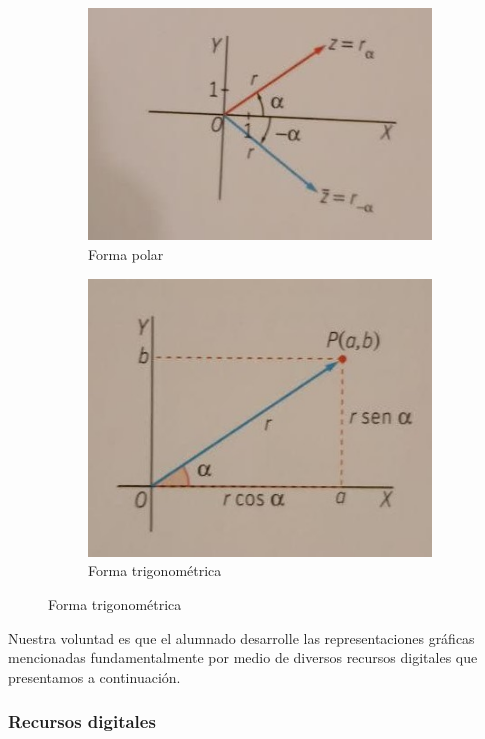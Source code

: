 \documentclass[../main.tex]{memoir}
\begin{document}
\begin{figure}[H]
	\centering
	\begin{subfigure}{0.48\textwidth}
		\centering
		\includegraphics[width=\linewidth]{images/polar.jpg}
		\caption{Forma polar}
	\end{subfigure}
	\begin{subfigure}{0.48\textwidth}
		\centering
		\includegraphics[scale=0.39]{images/trigonometrica.jpg}
		\caption{Forma trigonométrica}
	\end{subfigure}
	\label{fig:representacion3}
\end{figure}

Nuestra voluntad es que el alumnado desarrolle las representaciones gráficas mencionadas fundamentalmente por medio de diversos recursos digitales que presentamos a continuación.
\subsubsection{Recursos digitales}
\end{document}
